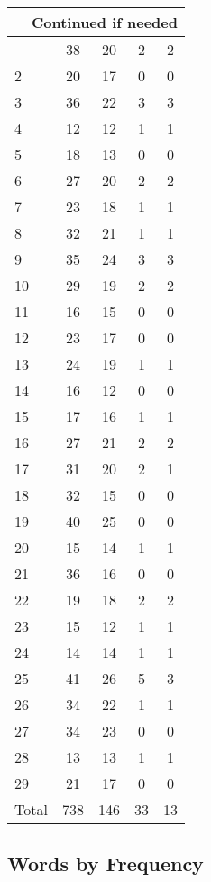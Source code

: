 \begin{center}
\begin{longtable}{l|c|c|c|c}
\hline \multicolumn{5}{|r|}{{Continued if needed}} \\ \hline
\endfoot 
1 & 38 & 20 & 2 & 2\\ \hline
2 & 20 & 17 & 0 & 0\\ \hline
3 & 36 & 22 & 3 & 3\\ \hline
4 & 12 & 12 & 1 & 1\\ \hline
5 & 18 & 13 & 0 & 0\\ \hline
6 & 27 & 20 & 2 & 2\\ \hline
7 & 23 & 18 & 1 & 1\\ \hline
8 & 32 & 21 & 1 & 1\\ \hline
9 & 35 & 24 & 3 & 3\\ \hline
10 & 29 & 19 & 2 & 2\\ \hline
11 & 16 & 15 & 0 & 0\\ \hline
12 & 23 & 17 & 0 & 0\\ \hline
13 & 24 & 19 & 1 & 1\\ \hline
14 & 16 & 12 & 0 & 0\\ \hline
15 & 17 & 16 & 1 & 1\\ \hline
16 & 27 & 21 & 2 & 2\\ \hline
17 & 31 & 20 & 2 & 1\\ \hline
18 & 32 & 15 & 0 & 0\\ \hline
19 & 40 & 25 & 0 & 0\\ \hline
20 & 15 & 14 & 1 & 1\\ \hline
21 & 36 & 16 & 0 & 0\\ \hline
22 & 19 & 18 & 2 & 2\\ \hline
23 & 15 & 12 & 1 & 1\\ \hline
24 & 14 & 14 & 1 & 1\\ \hline
25 & 41 & 26 & 5 & 3\\ \hline
26 & 34 & 22 & 1 & 1\\ \hline
27 & 34 & 23 & 0 & 0\\ \hline
28 & 13 & 13 & 1 & 1\\ \hline
29 & 21 & 17 & 0 & 0\\ \hline
\hline \hline
Total & 738 & 146 & 33 & 13



\end{longtable}
\end{center}

 
\subsection{Words by Frequency}

